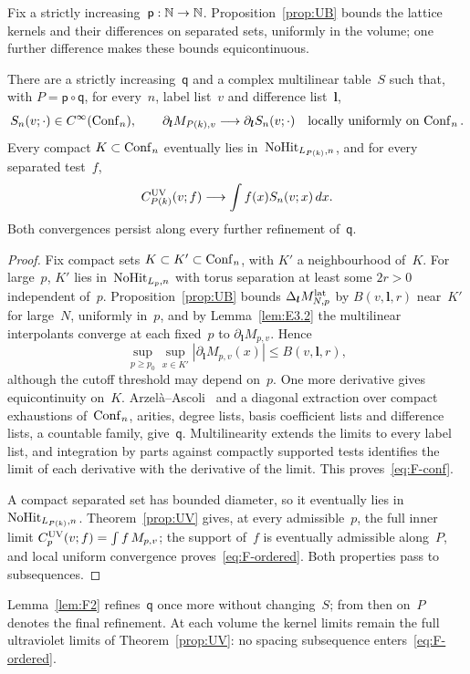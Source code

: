 Fix a strictly increasing~$\mathsf p:\mathbb{N}\to\mathbb{N}$. Proposition~\ref{prop:UB} bounds the lattice kernels and their differences on separated sets, uniformly in the volume; one further difference makes these bounds equicontinuous.
\begin{lemma}\label{lem:F1}
There are a strictly increasing~$\mathsf q$ and a complex multilinear table~$S$ such that, with $P=\mathsf p\circ\mathsf q$, for every~$n$, label list~$v$ and difference list~$\boldsymbol l$,
\begin{equation}\label{eq:F-conf}
S_n(v;\cdot)\in C^\infty(\mathrm{Conf}_{n}),\qquad
\partial_{\boldsymbol l}M_{P(k),v}\longrightarrow
\partial_{\boldsymbol l}S_n(v;\cdot)
\quad\text{locally uniformly on }\mathrm{Conf}_{n}\,.
\end{equation}
Every compact $K\subset\mathrm{Conf}_{n}$ eventually lies in~$\mathrm{NoHit}_{L_{P(k)},n}$, and for every separated test~$f$,
\begin{equation}\label{eq:F-ordered}
C_{P(k)}^{\rm UV}(v;f)\longrightarrow\int f(x)S_n(v;x)\,dx.
\end{equation}
Both convergences persist along every further refinement of~$\mathsf q$.
\end{lemma}
\begin{proof}
Fix compact sets $K\subset K'\subset\mathrm{Conf}_{n}$, with $K'$ a neighbourhood of~$K$. For large~$p$, $K'$ lies in~$\mathrm{NoHit}_{L_p,n}$ with torus separation at least some $2r>0$ independent of~$p$. Proposition~\ref{prop:UB} bounds $\Delta_{\boldsymbol l}M^{\mathrm{lat}}_{N,p}$ by $B(v,\boldsymbol l,r)$ near~$K'$ for large~$N$, uniformly in~$p$, and by Lemma~\ref{lem:E3.2} the multilinear interpolants converge at each fixed~$p$ to $\partial_{\boldsymbol l}M_{p,v}$. Hence
\begin{equation}\label{eq:F-local}
\sup_{p\ge p_0}\sup_{x\in K'}|\partial_{\boldsymbol l}M_{p,v}(x)|
\le B(v,\boldsymbol l,r),
\end{equation}
although the cutoff threshold may depend on~$p$. One more derivative gives equicontinuity on~$K$. Arzelà--Ascoli~\cite[Theorem~7.25]{Rudin1976} and a diagonal extraction over compact exhaustions of~$\mathrm{Conf}_{n}$, arities, degree lists, basis coefficient lists and difference lists, a countable family, give~$\mathsf q$. Multilinearity extends the limits to every label list, and integration by parts against compactly supported tests identifies the limit of each derivative with the derivative of the limit. This proves~\eqref{eq:F-conf}.

A compact separated set has bounded diameter, so it eventually lies in~$\mathrm{NoHit}_{L_{P(k)},n}$. Theorem~\ref{prop:UV} gives, at every admissible~$p$, the full inner limit $C_p^{\rm UV}(v;f)=\int f\,M_{p,v}$; the support of~$f$ is eventually admissible along~$P$, and local uniform convergence proves~\eqref{eq:F-ordered}. Both properties pass to subsequences.
\end{proof}
Lemma~\ref{lem:F2} refines~$\mathsf q$ once more without changing~$S$; from then on~$P$ denotes the final refinement. At each volume the kernel limits remain the full ultraviolet limits of Theorem~\ref{prop:UV}: no spacing subsequence enters~\eqref{eq:F-ordered}.

